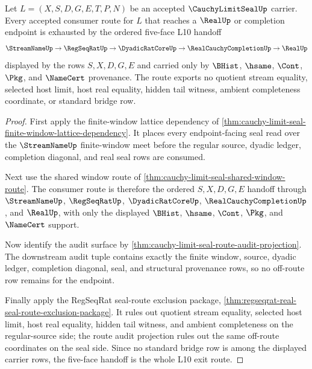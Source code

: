 \begin{theorem}
\label{thm:cauchy-limit-seal-five-face-l10-exit-route}
Let $L=(X,S,D,G,E,T,P,N)$ be an accepted $\CauchyLimitSealUp$ carrier. Every accepted consumer route for $L$ that reaches a $\RealUp$ or completion endpoint is exhausted by the ordered five-face L10 handoff
$$
\StreamNameUp \to \RegSeqRatUp \to \DyadicRatCoreUp \to \RealCauchyCompletionUp \to \RealUp
$$
displayed by the rows $S,X,D,G,E$ and carried only by $\BHist$, $\hsame$, $\Cont$, $\Pkg$, and $\NameCert$ provenance. The route exports no quotient stream equality, selected host limit, host real equality, hidden tail witness, ambient completeness coordinate, or standard bridge row.
\end{theorem}
\begin{proof}
First apply the finite-window lattice dependency of \autoref{thm:cauchy-limit-seal-finite-window-lattice-dependency}. It places every endpoint-facing seal read over the $\StreamNameUp$ finite-window meet before the regular source, dyadic ledger, completion diagonal, and real seal rows are consumed.

Next use the shared window route of \autoref{thm:cauchy-limit-seal-shared-window-route}. The consumer route is therefore the ordered $S,X,D,G,E$ handoff through $\StreamNameUp$, $\RegSeqRatUp$, $\DyadicRatCoreUp$, $\RealCauchyCompletionUp$, and $\RealUp$, with only the displayed $\BHist$, $\hsame$, $\Cont$, $\Pkg$, and $\NameCert$ support.

Now identify the audit surface by \autoref{thm:cauchy-limit-seal-route-audit-projection}. The downstream audit tuple contains exactly the finite window, source, dyadic ledger, completion diagonal, seal, and structural provenance rows, so no off-route row remains for the endpoint.

Finally apply the RegSeqRat seal-route exclusion package, \autoref{thm:regseqrat-real-seal-route-exclusion-package}. It rules out quotient stream equality, selected host limit, host real equality, hidden tail witness, and ambient completeness on the regular-source side; the route audit projection rules out the same off-route coordinates on the seal side. Since no standard bridge row is among the displayed carrier rows, the five-face handoff is the whole L10 exit route.
\end{proof}

